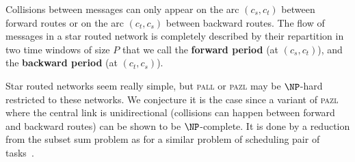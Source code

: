 \documentclass[10pt, conference, letterpaper]{IEEEtran}
\newcommand\pazl{\textsc{pazl}\xspace}
\newcommand\pall{\textsc{pall}\xspace}
\begin{document}
      
  Collisions between messages can only appear on the arc $(c_s,c_t)$ between forward routes or on the arc $(c_t,c_s)$
  between backward routes. The flow of messages in a star routed network is completely described by their repartition in two time windows of size $P$ that we call the {\bf forward period} (at $(c_s,c_t)$), and the {\bf backward period} (at $(c_t,c_s)$).

  Star routed networks seem really simple, but \pall or \pazl may be $\NP$-hard restricted to these networks.
  We conjecture it is the case since  a variant of \pazl where the central link is unidirectional (collisions can happen between forward and backward routes) can be shown to be $\NP$-complete. It is done by a reduction from the subset sum problem as for a similar problem of scheduling pair of tasks~\cite{orman1997complexity}. 
      
\end{document}
